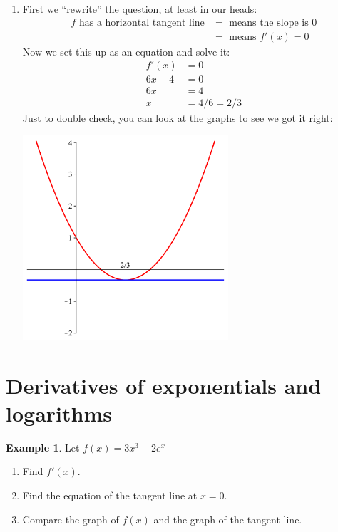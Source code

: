 \documentclass[oneside]{book}
\theoremstyle{definition}
\newtheorem{example}{Example}
\theoremstyle{solution}
\newtheorem*{solution}{Solution}
\newenvironment{solution}{\vspace{2in}\comment}{\endcomment}
\begin{document}
\begin{solution}
\begin{enumerate}
\item First we ``rewrite'' the question, at least in our heads:
\begin{align*}
f \text{ has a horizontal tangent line} & = \text{ means the slope is $0$}\\
  & = \text{ means }f'(x)=0
\end{align*}
Now we set this up as an equation and solve it:
\begin{align*}
f'(x) & = 0\\
6x-4 & = 0\\
6x & = 4\\
x & = 4/6 = 2/3
\end{align*}
Just to double check, you can look at the graphs to see we got it right:
\begin{center}
\includegraphics[width=3in]{"quadratic with horizontal tangent line"}
\end{center}
\end{enumerate}
\end{solution}

\section{Derivatives of exponentials and logarithms}

\begin{example}
Let $f(x) = 3x^3+2e^x$
\begin{enumerate}
\item Find $f'(x)$.

\item Find the equation of the tangent line at $x = 0$.

\item Compare the graph of $f(x)$ and the graph of the tangent line.
\end{enumerate}
\end{example}
\end{document}

